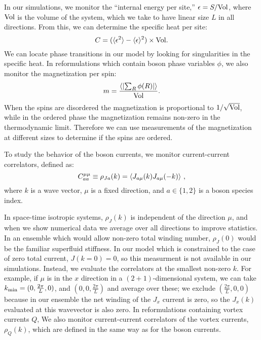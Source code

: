 In our simulations, we monitor the ``internal energy per site,'' $\epsilon= S /{\rm Vol}$, where ${\rm Vol}$ is the volume of the system, which we take to have linear size $L$ in all directions. From this, we can determine the specific heat per site:
\begin{equation}
C=(\langle \epsilon^2\rangle-\langle\epsilon\rangle^2)\times{\rm Vol}.
\end{equation}
We can locate phase transitions in our model by looking for singularities in the specific heat. In reformulations which contain boson phase variables $\phi$, we also monitor the magnetization per spin:
\begin{equation}
m = \frac{\left\langle \left|\sum_R \phi(R) \right|\right\rangle}{\rm Vol}.
\end{equation}
When the spins are disordered the magnetization is proportional to $1/\sqrt{\rm Vol}$, while in the ordered phase the magnetization remains non-zero in the thermodynamic limit. Therefore we can use measurements of the magnetization at different sizes to determine if the spins are ordered.

To study the behavior of the boson currents, we monitor current-current correlators, defined as:
\begin{equation}
C^{\mu\mu}_{aa}\equiv\rho_{Ja}({k})=\langle J_{a\mu}({k})J_{a\mu}(-{k})\rangle ~,
\label{rho}
\end{equation}
where $k$ is a wave vector, $\mu$ is a fixed direction, and  $a\in\{1,2\}$ is a boson species index.

In space-time isotropic systems, $\rho_J({k})$ is independent of the direction $\mu$, and when we show numerical data we average over all directions to improve statistics. In an ensemble which would allow non-zero total winding number, $\rho_J(0)$ would be the familiar superfluid stiffness. In our model which is constrained to the case of zero total current, $J(k=0)=0$, so this measurment is not available in our simulations. Instead, we evaluate the correlators at the smallest non-zero ${k}$.  For example, if $\mu$ is in the $x$ direction in a $(2+1)$-dimensional system, we can take ${k}_{\rm min}=(0,\frac{2\pi}{L},0)$, and $(0,0,\frac{2\pi}{L})$ and average over these; we exclude $(\frac{2\pi}{L},0,0)$ because in our ensemble the net winding of the $J_x$ current is zero, so the $J_x(k)$ evaluated at this wavevector is also zero. In reformulations containing vortex currents $Q$, We also monitor current-current correlators of the vortex currents, $\rho_Q(k)$, which are defined in the same way as for the boson currents.

